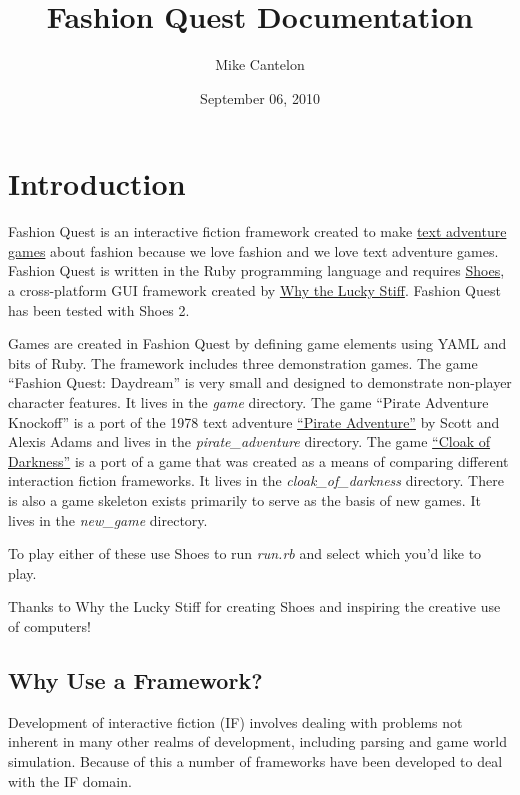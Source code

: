 \documentclass[letterpaper,10pt,english]{sphinxmanual}
\title{Fashion Quest Documentation}
\date{September 06, 2010}
\author{Mike Cantelon}
\begin{document}
\maketitle
\tableofcontents
{}\label{index::doc}



\chapter{Introduction}
\label{introduction:introduction}\label{introduction::doc}\label{introduction:fashion-quest}
Fashion Quest is an interactive fiction framework created to make \href{http://en.wikipedia.org/wiki/Interactive\_fiction}{text adventure games} about fashion because we love fashion and we love text adventure games. Fashion Quest is written in the Ruby programming language and requires \href{http://shoes.heroku.com/}{Shoes}, a cross-platform GUI framework created by \href{http://en.wikipedia.org/wiki/Why\_the\_lucky\_stiff/}{Why the Lucky Stiff}. Fashion Quest has been tested with Shoes 2.

Games are created in Fashion Quest by defining game elements using YAML and bits of Ruby. The framework includes three demonstration games. The game ``Fashion Quest: Daydream'' is very small and designed to demonstrate non-player character features. It lives in the \emph{game} directory. The game ``Pirate Adventure Knockoff'' is a port of the 1978 text adventure \href{http://en.wikipedia.org/wiki/Pirate\_Adventure}{``Pirate Adventure''} by Scott and Alexis Adams and lives in the \emph{pirate\_adventure} directory. The game \href{http://www.firthworks.com/roger/cloak/}{``Cloak of Darkness''} is a port of a game that was created as a means of comparing different interaction fiction frameworks. It lives in the \emph{cloak\_of\_darkness} directory. There is also a game skeleton exists primarily to serve as the basis of new games. It lives in the \emph{new\_game} directory.

To play either of these use Shoes to run \emph{run.rb} and select which you’d like to play.

Thanks to Why the Lucky Stiff for creating Shoes and inspiring the creative use of computers!


\section{Why Use a Framework?}
\label{introduction:why-use-a-framework}\label{introduction:cloak-of-darkness}
Development of interactive fiction (IF) involves dealing with problems not inherent in many other realms of development, including parsing and game world simulation. Because of this a number of frameworks have been developed to deal with the IF domain.
\end{document}
